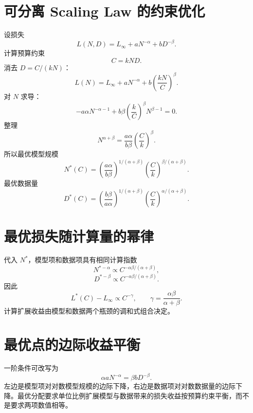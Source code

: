 \documentclass[UTF8,12pt,a4paper,fontset=none]{ctexart}
\numberwithin{equation}{section}
\begin{document}
\section{可分离 Scaling Law 的约束优化}
设损失
\begin{equation}
 L(N,D)=L_\infty+aN^{-\alpha}+bD^{-\beta}.
\end{equation}
计算预算约束
\begin{equation}
 C=kND.
\end{equation}
消去 $D=C/(kN)$：
\begin{equation}
 L(N)=L_\infty+aN^{-\alpha}
 +b\left(\frac{kN}{C}\right)^\beta.
\end{equation}
对 $N$ 求导：
\begin{equation}
 -a\alpha N^{-\alpha-1}
 +b\beta\left(\frac{k}{C}\right)^\beta
 N^{\beta-1}=0.
\end{equation}
整理
\begin{equation}
 N^{\alpha+\beta}
 =\frac{a\alpha}{b\beta}
 \left(\frac{C}{k}\right)^\beta.
\end{equation}
所以最优模型规模
\begin{equation}
 \boxed{N^*(C)=
 \left(\frac{a\alpha}{b\beta}\right)^{1/(\alpha+\beta)}
 \left(\frac{C}{k}\right)^{\beta/(\alpha+\beta)}.}
\end{equation}
最优数据量
\begin{equation}
 \boxed{D^*(C)=
 \left(\frac{b\beta}{a\alpha}\right)^{1/(\alpha+\beta)}
 \left(\frac{C}{k}\right)^{\alpha/(\alpha+\beta)}.}
\end{equation}

\section{最优损失随计算量的幂律}
代入 $N^*$，模型项和数据项具有相同计算指数
\begin{equation}
 N^{*-\alpha}\propto
 C^{-\alpha\beta/(\alpha+\beta)},
\end{equation}
\begin{equation}
 D^{*-\beta}\propto
 C^{-\alpha\beta/(\alpha+\beta)}.
\end{equation}
因此
\begin{equation}
 L^*(C)-L_\infty
 \propto C^{-\gamma},
 \qquad
 \gamma=\frac{\alpha\beta}{\alpha+\beta}.
\end{equation}
计算扩展收益由模型和数据两个瓶颈的调和式组合决定。

\section{最优点的边际收益平衡}
一阶条件可改写为
\begin{equation}
 \alpha aN^{-\alpha}
 =\beta bD^{-\beta}.
\end{equation}
左边是模型项对对数模型规模的边际下降，右边是数据项对对数数据量的边际下降。最优分配要求单位比例扩展模型与数据带来的损失收益按预算约束平衡，而不是要求两项数值相等。
\end{document}
